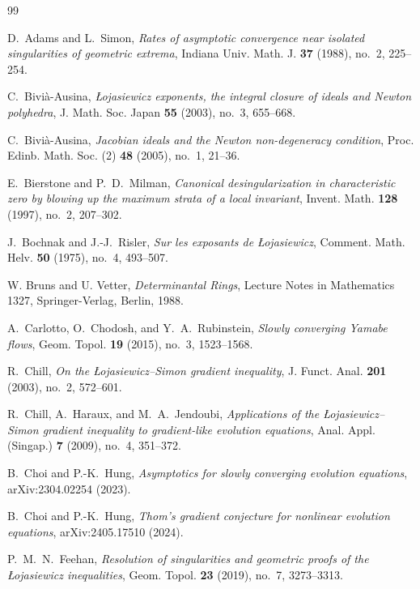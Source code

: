 \documentclass[11pt]{article}
\theoremstyle{definition}
\theoremstyle{remark}
\begin{document}
\begin{thebibliography}{99}

D.~Adams and L.~Simon,
\emph{Rates of asymptotic convergence near isolated singularities of geometric extrema},
Indiana Univ. Math. J. \textbf{37} (1988), no.~2, 225--254.

C.~Bivi\`a-Ausina,
\emph{\L{}ojasiewicz exponents, the integral closure of ideals and Newton polyhedra},
J. Math. Soc. Japan \textbf{55} (2003), no.~3, 655--668.

C.~Bivi\`a-Ausina,
\emph{Jacobian ideals and the Newton non-degeneracy condition},
Proc. Edinb. Math. Soc. (2) \textbf{48} (2005), no.~1, 21--36.

E.~Bierstone and P.~D.~Milman,
\emph{Canonical desingularization in characteristic zero by blowing up the maximum strata of a local invariant},
Invent. Math. \textbf{128} (1997), no.~2, 207--302.

J.~Bochnak and J.-J.~Risler,
\emph{Sur les exposants de \L{}ojasiewicz},
Comment. Math. Helv. \textbf{50} (1975), no.~4, 493--507.

W. Bruns and U. Vetter,
\emph{Determinantal Rings},
Lecture Notes in Mathematics 1327,
Springer-Verlag, Berlin, 1988.

A.~Carlotto, O.~Chodosh, and Y.~A.~Rubinstein,
\emph{Slowly converging Yamabe flows},
Geom. Topol. \textbf{19} (2015), no.~3, 1523--1568.

R.~Chill,
\emph{On the \L{}ojasiewicz--Simon gradient inequality},
J. Funct. Anal. \textbf{201} (2003), no.~2, 572--601.

R.~Chill, A.~Haraux, and M.~A.~Jendoubi,
\emph{Applications of the \L{}ojasiewicz--Simon gradient inequality to gradient-like evolution equations},
Anal. Appl. (Singap.) \textbf{7} (2009), no.~4, 351--372.

B.~Choi and P.-K.~Hung,
\emph{Asymptotics for slowly converging evolution equations},
arXiv:2304.02254 (2023).

B.~Choi and P.-K.~Hung,
\emph{Thom's gradient conjecture for nonlinear evolution equations},
arXiv:2405.17510 (2024).

P.~M.~N.~Feehan,
\emph{Resolution of singularities and geometric proofs of the \L{}ojasiewicz inequalities},
Geom. Topol. \textbf{23} (2019), no.~7, 3273--3313.


\end{thebibliography}
\end{document}
